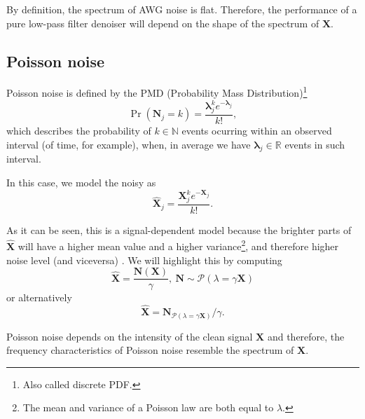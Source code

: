\documentclass{article}
\begin{document}
By definition, the spectrum of AWG noise is flat. Therefore, the
performance of a pure low-pass filter denoiser will depend on the
shape of the spectrum of $\mathbf{X}$.

\subsection{Poisson noise}
Poisson noise is defined by the PMD (Probability Mass
Distribution)\footnote{Also called discrete PDF.}
\begin{equation}
  \Pr({\mathbf N}_j{=}k) = \frac{\mathbf{\lambda}_j^ke^{-\mathbf{\lambda}_j}}{k!},
  \label{eq:PN}
\end{equation}
which describes the probability of $k\in\mathbb{N}$ events ocurring
within an observed interval (of time, for example), when, in average
we have ${\mathbf \lambda}_j\in\mathbb{R}$ events in such interval.

In this case, we model the noisy as
\begin{equation}
  \hat{{\mathbf X}}_j = \frac{{\mathbf X}_j^{k} e^{-{\mathbf X}_j}}{k!}.
\end{equation}

As it can be seen, this is a signal-dependent model because the
brighter parts of $\hat{\mathbf X}$ will have a higher mean value and
a higher variance\footnote{The mean and variance of a Poisson law are
  both equal to $\lambda$.}, and therefore higher noise level (and
viceversa) \cite{meiniel2018denoising}. We will highlight this by
computing
\begin{equation}
  \hat{\mathbf{X}} = \frac{\mathbf{N}(\mathbf{X})}{\gamma},~\mathbf{N}\sim\mathcal{P}(\lambda=\gamma\mathbf{X})
\end{equation}
or alternatively
\begin{equation}
  \hat{\mathbf{X}} = \mathbf{N}_{\mathcal{P}(\lambda=\gamma\mathbf{X})}/\gamma.
\end{equation}

Poisson noise depends on the intensity of the clean signal $\mathbf{X}$ and
therefore, the frequency characteristics of Poisson noise resemble the
spectrum of $\mathbf{X}$.
\end{document}
